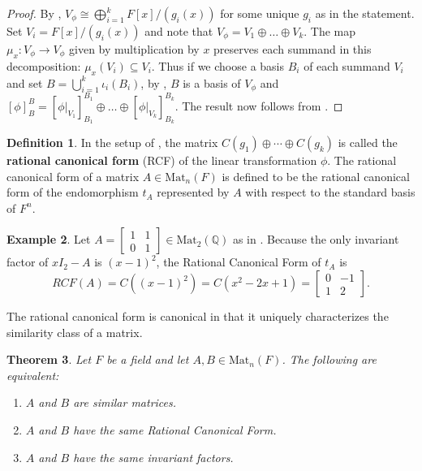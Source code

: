 \documentclass[12pt]{report}
\newtheorem{theorem}{Theorem}[chapter]
\numberwithin{equation}{section}
\numberwithin{theorem}{chapter}
\theoremstyle{definition}
\newtheorem{definition}[theorem]{Definition}
\newtheorem{example}[theorem]{Example}
\newtheorem*{basic properties}{Basic Properties}
\newtheorem*{Important Remark}{Important Remark}
\newcommand{\df}[1]{{\bf #1}\index{#1}}
\begin{document}
\begin{proof} 
By , $V_\phi \cong \bigoplus_{i=1}^k F[x]/(g_i(x))$ for some unique $g_i$ as in the statement. Set $V_i=F[x]/(g_i(x))$ and note that $V_\phi=V_1\oplus \dots \oplus V_k$. The map $\mu _x\!:V_\phi\to V_\phi $ given by multiplication by $x$ preserves each summand in this decomposition: $\mu_x(V_i)\subseteq V_i$. Thus if we choose a basis $B_i$ of each summand $V_i$ and set $B=\bigcup_{i=1}^k \iota_i(B_i)$, by , $B$ is a basis of $V_\phi$ and $[\phi]_B^B=[\phi|_{V_1}]_{B_1}^{B_1}\oplus \dots \oplus [\phi|_{V_k}]_{B_k}^{B_k}$. The result now follows from .
\end{proof}

\begin{definition}
In the setup of , the matrix $C(g_1) \oplus \cdots \oplus C(g_k)$ is called the \df{rational canonical form} (RCF) of the linear transformation $\phi$. The rational canonical form of a matrix $A\in \mathrm{Mat}_n(F)$ is defined to be the rational canonical form of the endomorphism $t_A$ represented by $A$ with respect to the standard basis of $F^n$.
\end{definition}



\begin{example}
Let $ A= \begin{bmatrix} 1 & 1 \\ 0 & 1  \end{bmatrix}\in \mathrm{Mat}_2(\mathbb{Q})$ as in . 
Because the only invariant factor of $xI_2 - A$ is $(x-1)^2$, the Rational Canonical Form of $t_A$ is 
$$RCF(A)=C((x-1)^2)=C(x^2-2x+1)=\begin{bmatrix} 0 & -1 \\ 1 & 2 \end{bmatrix}.$$
\end{example}


The rational canonical form is canonical in that it uniquely characterizes the similarity class of a matrix.

\begin{theorem}
Let $F$ be a field and let $A, B \in \mathrm{Mat}_n(F)$. The following are equivalent:
\begin{enumerate}[leftmargin=17pt,label=(\arabic*)]
\item $A$ and $B$ are similar matrices. 
\item $A$ and $B$ have the same Rational Canonical Form. 
\item $A$ and $B$ have the same invariant factors. 
\end{enumerate}
\end{theorem}
\end{document}
